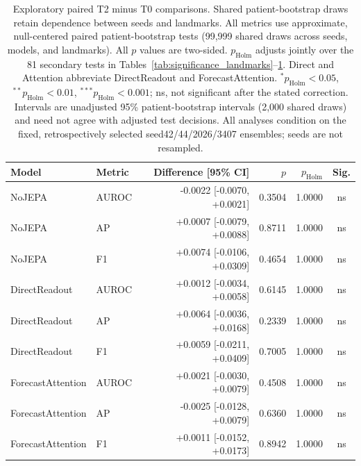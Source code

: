 \begin{table}[t]
\centering
\small
\caption{Exploratory paired T2 minus T0 comparisons. Shared patient-bootstrap draws retain dependence between seeds and landmarks. All metrics use approximate, null-centered paired patient-bootstrap tests (99,999 shared draws across seeds, models, and landmarks). All $p$ values are two-sided. $p_{\mathrm{Holm}}$ adjusts jointly over the 81 secondary tests in Tables~\ref{tab:significance_landmarks}--\ref{tab:significance_longitudinal}. Direct and Attention abbreviate DirectReadout and ForecastAttention. $^{*}p_{\mathrm{Holm}}<0.05$, $^{**}p_{\mathrm{Holm}}<0.01$, $^{***}p_{\mathrm{Holm}}<0.001$; ns, not significant after the stated correction. Intervals are unadjusted 95\% patient-bootstrap intervals (2,000 shared draws) and need not agree with adjusted test decisions. All analyses condition on the fixed, retrospectively selected seed42/44/2026/3407 ensembles; seeds are not resampled.}
\label{tab:significance_longitudinal}
\begin{tabular}{llrrrc}
\toprule
Model & Metric & Difference [95\% CI] & $p$ & $p_{\mathrm{Holm}}$ & Sig. \\
\midrule
NoJEPA & AUROC & -0.0022 [-0.0070, +0.0021] & 0.3504 & 1.0000 & ns \\
NoJEPA & AP & +0.0007 [-0.0079, +0.0088] & 0.8711 & 1.0000 & ns \\
NoJEPA & F1 & +0.0074 [-0.0106, +0.0309] & 0.4654 & 1.0000 & ns \\
DirectReadout & AUROC & +0.0012 [-0.0034, +0.0058] & 0.6145 & 1.0000 & ns \\
DirectReadout & AP & +0.0064 [-0.0036, +0.0168] & 0.2339 & 1.0000 & ns \\
DirectReadout & F1 & +0.0059 [-0.0211, +0.0409] & 0.7005 & 1.0000 & ns \\
ForecastAttention & AUROC & +0.0021 [-0.0030, +0.0079] & 0.4508 & 1.0000 & ns \\
ForecastAttention & AP & -0.0025 [-0.0128, +0.0079] & 0.6360 & 1.0000 & ns \\
ForecastAttention & F1 & +0.0011 [-0.0152, +0.0173] & 0.8942 & 1.0000 & ns \\
\bottomrule
\end{tabular}
\end{table}
